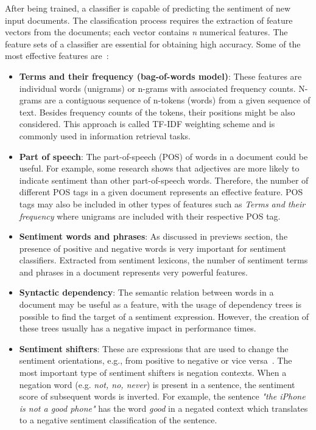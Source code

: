 {After being trained, a classifier is capable of predicting the sentiment of new input documents. The classification process requires the extraction of feature vectors from the documents; each vector contains \textit{n} numerical features. The feature sets of a classifier are essential for obtaining high accuracy. Some of the most effective features are~\cite[p. 25]{liu2012sentiment}: 

 \begin{itemize}
  \item \textbf{Terms and their frequency (bag-of-words model)}: These features are individual words (unigrams) or n-grams with associated frequency counts. N-grams are a contiguous sequence of n-tokens (words) from a given sequence of text. Besides frequency counts of the tokens, their positions might be also considered. This approach is called TF-IDF weighting scheme and is commonly used in information retrieval tasks.

    \item \textbf{Part of speech}: The part-of-speech (POS) of words in a document could be useful. For example, some research shows that adjectives are more likely to indicate sentiment than other part-of-speech words. Therefore, the number of different POS tags in a given document represents an effective feature. POS tags may also be included in other types of features such as \textit{Terms and their frequency} where unigrams are included with their respective POS tag.
    
    \item \textbf{Sentiment words and phrases}: As discussed in previews section, the presence of positive and negative words is very important for sentiment classifiers. Extracted from sentiment lexicons, the number of sentiment terms and phrases in a document represents very powerful features. 
    
    \item \textbf{Syntactic dependency}: The semantic relation between words in a document may be useful as a feature, with the usage of dependency trees is possible to find the target of a sentiment expression. However, the creation of these trees usually has a negative impact in performance times. 
    
    \item \textbf{Sentiment shifters}: These are expressions that are used to change the sentiment orientations, e.g., from positive to negative or vice versa~\cite[p. 26]{liu2012sentiment}. The most important type of sentiment shifters is negation contexts. When a negation word (e.g. \textit{not, no, never}) is present in a sentence, the sentiment score of subsequent words is inverted. For example, the sentence \textit{"the iPhone is not a good phone"} has the word \textit{good} in a negated context which translates to a negative sentiment classification of the sentence.
    

\end{itemize}}
